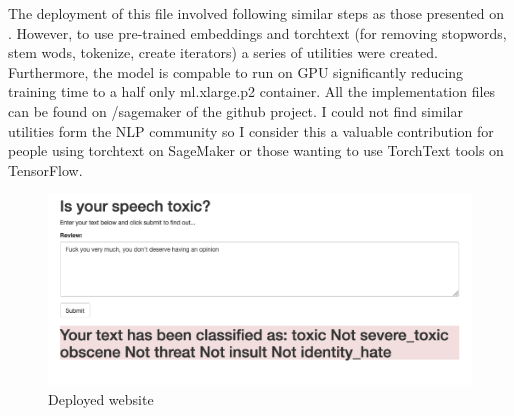 \documentclass{report}
\begin{document}
The deployment of this file involved following similar steps as those presented on \cite{Udacity}. However, 
to use pre-trained embeddings and torchtext (for removing stopwords, stem wods, tokenize, create iterators)
a series of utilities were created. Furthermore, the model is compable to run on GPU significantly reducing 
training time to a half only ml.xlarge.p2 container. All the implementation files can be found on
/sagemaker of the github project. I could not find similar utilities form the NLP community so I consider this a valuable
contribution for people using torchtext on SageMaker or those wanting to use TorchText tools on TensorFlow. 


\begin{figure}[!h]
\centering
  \includegraphics[width=160mm]{../local/plots_tables/website.png}
  \caption{Deployed website}
  \label{fig:website}
\end{figure}





\end{document}
